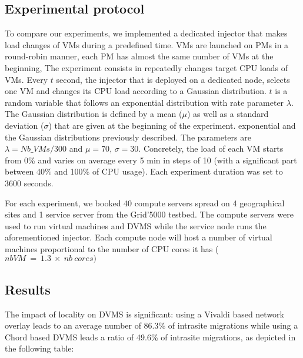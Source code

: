 \subsection{Experimental protocol}
To compare our experiments, we implemented a dedicated injector that makes load
changes of VMs during a predefined time.  VMs are launched on PMs in a
round-robin manner, \ie each PM has almost the same number of VMs at the
beginning, The experiment consists in  repeatedly changes target CPU loads of
VMs.  Every $t$ second, the injector that is deployed on a dedicated node,
selects one VM and changes its CPU load according to a Gaussian distribution.
$t$ is a random variable that follows an exponential distribution with rate
parameter $\lambda$. The Gaussian distribution is defined by a mean ($\mu$) as
well as a standard deviation ($\sigma$) that are given at the beginning of the
experiment. 
exponential and the Gaussian distributions previously described. 
The parameters are $\lambda=\mathit{Nb\_VMs}/300$ and $\mu=70$, $\sigma=30$.
Concretely, the load of each VM starts from 0\% and varies on average every 5
min in steps of 10 (with a significant part between 40\% and 100\% of CPU
usage).   Each experiment duration was set to 3600 seconds.

For each experiment, we booked 40 compute servers spread on 4 geographical sites
and 1 service server from the Grid'5000 testbed. The compute servers were used 
to run virtual machines and DVMS while the service node runs the aforementioned
injector.
%
Each compute node will host a number of virtual machines proportional to the 
number of CPU cores it has ($nb VM\ =\ 1.3\ \times\ nb\ cores)$

\subsection{Results}

The impact of locality on DVMS is significant: using a Vivaldi based network
overlay leads to an average number of 86.3\% of intrasite migrations while using 
a Chord based DVMS leads a ratio of 49.6\% of intrasite migrations, as depicted
in the following table:

